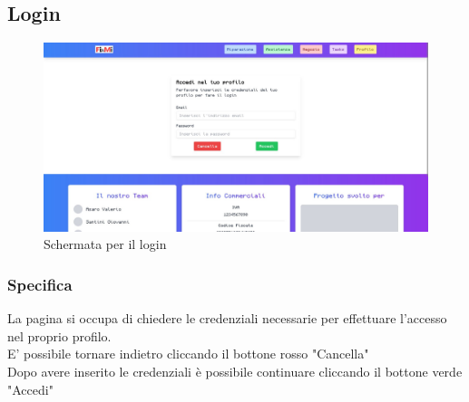 \documentclass{report}
\begin{document}
\subsection{Login}

\begin{figure}[H]
	\centering\includegraphics[width=1\textwidth]{images/microservizio-autenticazione/frontend/accesso.jpg}
	\caption{Schermata per il login}
\end{figure}
\subsubsection*{Specifica}
La pagina si occupa di chiedere le credenziali necessarie per effettuare l'accesso nel proprio profilo.\\
E' possibile tornare indietro cliccando il bottone rosso "Cancella"\\
Dopo avere inserito le credenziali è possibile continuare cliccando il bottone verde "Accedi"
\end{document}
